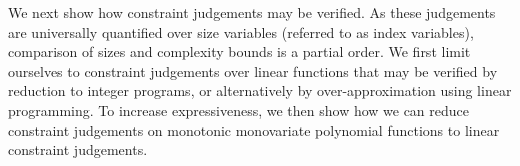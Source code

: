 We next show how constraint judgements may be verified. As these judgements are universally quantified over size variables (referred to as index variables), comparison of sizes and complexity bounds is a partial order. We first limit ourselves to constraint judgements over linear functions that may be verified by reduction to integer programs, or alternatively by over-approximation using linear programming. To increase expressiveness, we then show how we can reduce constraint judgements on monotonic monovariate polynomial functions to linear constraint judgements.\\




